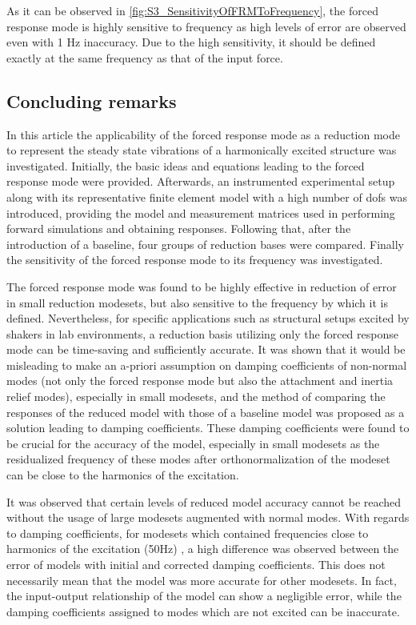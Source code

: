 As it can be observed in \cref{fig:S3_SensitivityOfFRMToFrequency}, the forced response mode is highly sensitive to frequency as high levels of error are observed even with 1 Hz inaccuracy. Due to the high sensitivity, it should be defined exactly at the same frequency as that of the input force. 

\subsection{Concluding remarks}
\label{sec:S3_concludingRemarks}

In this article the applicability of the forced response mode as a reduction mode to represent the steady state vibrations of a harmonically excited structure was investigated. Initially, the basic ideas and equations leading to the forced response mode were provided. Afterwards, an instrumented experimental setup along with its representative finite element model with a high number of \glspl{dof} was introduced, providing the model and measurement matrices used in performing forward simulations and obtaining responses. Following that, after the introduction of a baseline, four groups of reduction bases were compared. Finally the sensitivity of the forced response mode to its frequency was investigated. 

The forced response mode was found to be highly effective in reduction of error in small reduction modesets, but also sensitive to the frequency by which it is defined. Nevertheless, for specific applications such as structural setups excited by shakers in lab environments, a reduction basis utilizing only the forced response mode can be time-saving and sufficiently accurate. It was shown that it would be misleading to make an a-priori assumption on damping coefficients of non-normal modes (not only the forced response mode but also the attachment and inertia relief modes), especially in small modesets, and the method of comparing the responses of the reduced model with those of a baseline model was proposed as a solution leading to damping coefficients. These damping coefficients were found to be crucial for the accuracy of the model, especially in small modesets as the residualized frequency of these modes after orthonormalization of the modeset can be close to the harmonics of the excitation.

It was observed that certain levels of reduced model accuracy cannot be reached without the usage of large modesets augmented with normal modes. With regards to damping coefficients, for modesets which contained frequencies close to harmonics of the excitation (50Hz)  , a high difference was observed between the error of models with initial and corrected damping coefficients. This does not necessarily mean that the model was more accurate for other modesets. In fact, the input-output relationship of the model can show a negligible error, while the damping coefficients assigned to modes which are not excited can be inaccurate. 

